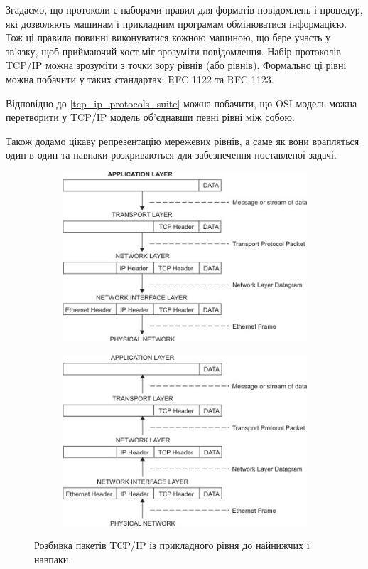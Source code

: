 Згадаємо, що протоколи є наборами правил для форматів повідомлень і процедур, які дозволяють машинам і прикладним програмам обмінюватися інформацією. Тож ці правила повинні виконуватися кожною машиною, що бере участь у зв’язку, щоб приймаючий хост міг зрозуміти повідомлення. Набір протоколів TCP/IP можна зрозуміти з точки зору рівнів (або рівнів). Формально ці рівні можна побачити у таких стандартах: RFC 1122 та RFC 1123.

Відповідно до \ref{tcp_ip_protocols_suite} можна побачити, що OSI модель можна перетворити у TCP/IP модель об'єднавши певні рівні між собою.

Також додамо цікаву репрезентацію мережевих рівнів, а саме як вони врапляться один в один та навпаки розкриваються для забезпечення поставленої задачі.

\begin{figure}[ht]
\centering
    \begin{subfigure}[b]{0.5\textwidth}    
        \includegraphics[scale=1.9]{../IMAGES/tcp_ip_layers_app_host.jpg}
        \caption{}
    \end{subfigure}%
    \begin{subfigure}[b]{0.5\textwidth}
        \includegraphics[scale=1.9]{../IMAGES/tcp_ip_layers_host_app.jpg}
        \caption{}
    \end{subfigure}
 
    \caption{{Розбивка пакетів TCP/IP із прикладного рівня до найнижчих і навпаки.}}
    \label{fig_sudak}
\end{figure}


